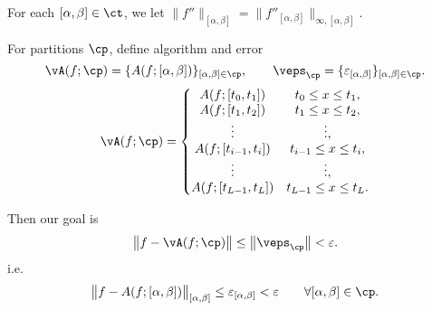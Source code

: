 \documentclass[]{elsarticle}
\theoremstyle{definition}
\theoremstyle{remark}
\begin{document}
For each $[\alpha,\beta]  \in \ct$,  we let
%
%
$  \bigl \lVert f'' \bigr \rVert_{[\alpha,\beta]} =  \bigl \lVert f''_{[\alpha,\beta] } \bigr \rVert_{\infty,[\alpha,\beta]}
$.

For partitions $\cp$, define algorithm and error
$$\vA(f;\cp)=\{A(f;[\alpha,\beta])\}_{[\alpha,\beta] \in \cp},  \qquad \veps_{\cp}=\{\varepsilon_{[\alpha,\beta]}\}_{[\alpha,\beta] \in \cp}.$$
$$
\vA(f;\cp)=\left\{
\begin{matrix}
A(f;[t_0,t_1]) & t_0 \le x \le t_1,\\
A(f;[t_1,t_2]) & t_1 \le x \le t_2,\\
\vdots & \vdots,\\
A(f;[t_{i-1},t_i]) & t_{i-1} \le x \le t_i,\\
\vdots & \vdots,\\
A(f;[t_{L-1},t_L]) & t_{L-1} \le x \le t_L.\\
\end{matrix}\right.
$$

Then our goal is
$$ \bigl \lVert f - \vA(f;\cp) \bigr \rVert \le  \bigl \lVert \veps_{\cp} \bigr \rVert < \varepsilon. $$
i.e.
$$ \bigl \lVert f- A(f;[\alpha,\beta]) \bigr \rVert_{[\alpha,\beta]}  \le  \varepsilon_{[\alpha,\beta]}  < \varepsilon \qquad \forall [\alpha,\beta] \in \cp.$$
\end{document}
